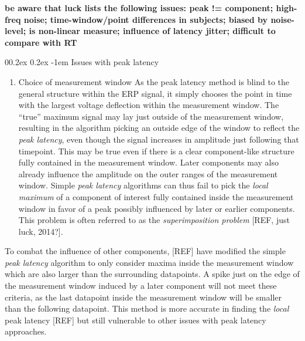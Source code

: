 \documentclass[
  man,floatsintext]{apa7}
\makeatletter
\providecommand{\tightlist}{%
  \setlength{\itemsep}{0pt}\setlength{\parskip}{0pt}}
\let\oldparagraph\paragraph
\renewcommand{\paragraph}[1]{\oldparagraph{#1}\mbox{}}
\renewcommand{\paragraph}{\@startsection{paragraph}{4}{\parindent}%
  {0\baselineskip \@plus 0.2ex \@minus 0.2ex}%
  {-1em}%
  {\normalfont\normalsize\bfseries\itshape\typesectitle}}
\renewcommand{\paragraph}{\@startsection{paragraph}{4}{\parindent}%
  {0\baselineskip \@plus 0.2ex \@minus 0.2ex}%
  {-1em}%
  {\normalfont\normalsize\bfseries\typesectitle}}
\makeatother
\begin{document}
\textbf{be aware that luck lists the following issues: peak != component; high-freq noise; time-window/point differences in subjects; biased by noise-level; is non-linear measure; influence of latency jitter; difficult to compare with RT}

\hypertarget{issues-with-peak-latency}{%
\paragraph{Issues with peak latency}\label{issues-with-peak-latency}}

\begin{enumerate}
\def\labelenumi{\arabic{enumi}.}
\tightlist
\item
  Choice of measurement window
  As the peak latency method is blind to the general structure within the ERP signal, it simply chooses the point in time with the largest voltage deflection within the measurement window. The ``true'' maximum signal may lay just outside of the measurement window, resulting in the algorithm picking an outside edge of the window to reflect the \emph{peak latency}, even though the signal increases in amplitude just following that timepoint. This may be true even if there is a clear component-like structure fully contained in the measurement window. Later components may also already influence the amplitude on the outer ranges of the measurement window. Simple \emph{peak latency} algorithms can thus fail to pick the \emph{local maximum} of a component of interest fully contained inside the measurement window in favor of a peak possibly influenced by later or earlier components. This problem is often referred to as the \emph{superimposition problem} {[}REF, just luck, 2014?{]}.
\end{enumerate}

To combat the influence of other components, {[}REF{]} have modified the simple \emph{peak latency} algorithm to only consider maxima inside the measurement window which are also larger than the surrounding datapoints. A spike just on the edge of the measurement window induced by a later component will not meet these criteria, as the last datapoint inside the measurement window will be smaller than the following datapoint. This method is more accurate in finding the \emph{local} peak latency {[}REF{]} but still vulnerable to other issues with peak latency approaches.
\end{document}
